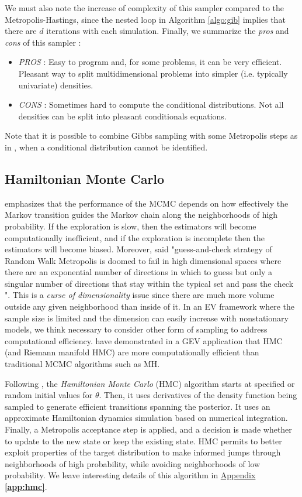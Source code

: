We must also note the increase of complexity of this sampler compared to the Metropolis-Hastings, since the nested loop in Algorithm \ref{algo:gib} implies that there are $d$ iterations with each simulation. Finally, we summarize the
\emph{pros} and \emph{cons} of this sampler : 

\begin{itemize}
	\item \emph{PROS} : Easy to program and, for some problems, it can be very efficient. Pleasant way to split multidimensional problems into simpler (i.e. typically univariate) densities.
	\item \emph{CONS} : Sometimes hard to compute the conditional distributions. Not all densities can be split into pleasant conditionals equations.
\end{itemize}
Note that it is possible to combine Gibbs sampling with some Metropolis steps as in \cite[chap.11]{Gelman95bayesiandata}, when a conditional distribution cannot be identified.


\subsection{Hamiltonian Monte Carlo}

\citet{betancourt_diagnosing_2016} emphasizes that the performance of the  MCMC depends on  how effectively the Markov transition guides the Markov chain along the neighborhoods of high probability. If the exploration is slow, then the estimators will become computationally inefficient, and if the exploration is incomplete then the estimators will become biased. Moreover, \citet{betancourt_2017_con} said "guess-and-check strategy of Random Walk Metropolis is doomed to fail in
high dimensional spaces where there are an exponential number of directions
in which to guess but only a singular number of directions that stay within the
typical set and pass the check ". This is a \emph{curse of dimensionality} issue since there are much more volume outside any given neighborhood than inside of it.
In an EV framework where the sample size is limited and the dimension can easily increase with nonstationary models, we think necessary to consider other form of sampling to address computational efficiency. \cite{hartmann_bayesian_2016} have demonstrated in a GEV application that HMC  (and Riemann manifold HMC) are more computationally efficient than traditional MCMC algorithms such as MH. 


Following \citet[chap.33]{stan_development_team_stan_2012}, the \emph{Hamiltonian Monte Carlo} (HMC)
algorithm starts at specified or random initial values for $\theta$. Then, it uses derivatives of the density function being sampled to generate efficient transitions spanning the posterior. It uses an approximate Hamiltonian dynamics simulation based on numerical integration. 
Finally, a Metropolis acceptance step is applied, and a decision is made whether to update to the new state or keep the existing state. 
HMC permits to better exploit properties of
the target distribution to make informed jumps through neighborhoods of high probability, while avoiding neighborhoods of low probability.  We leave interesting details of this algorithm in \hyperref[app:hmc]{Appendix \textbf{\ref{app:hmc}}}.

